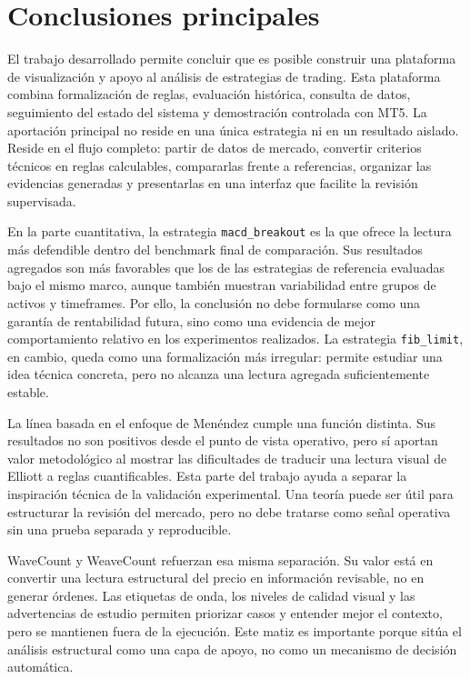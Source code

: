\section{Conclusiones principales}

El trabajo desarrollado permite concluir que es posible construir una plataforma
de visualizaci\'on y apoyo al an\'alisis de estrategias de trading. Esta plataforma
combina formalizaci\'on de reglas, evaluaci\'on hist\'orica, consulta de datos,
seguimiento del estado del sistema y demostraci\'on controlada con MT5. La
aportaci\'on principal no reside en una \'unica estrategia ni en un resultado
aislado. Reside en el flujo completo: partir de datos de mercado, convertir
criterios t\'ecnicos en reglas calculables, compararlas frente a referencias,
organizar las evidencias generadas y presentarlas en una interfaz que facilite
la revisi\'on supervisada.

En la parte cuantitativa, la estrategia \texttt{macd\_breakout} es la que ofrece
la lectura m\'as defendible dentro del benchmark final de comparaci\'on. Sus
resultados agregados son m\'as favorables que los de las estrategias de
referencia evaluadas bajo el mismo marco, aunque tambi\'en muestran variabilidad
entre grupos de activos y timeframes. Por ello, la conclusi\'on no debe
formularse como una garant\'ia de rentabilidad futura, sino como una evidencia de
mejor comportamiento relativo en los experimentos realizados. La estrategia
\texttt{fib\_limit}, en cambio, queda como una formalizaci\'on m\'as irregular:
permite estudiar una idea t\'ecnica concreta, pero no alcanza una lectura
agregada suficientemente estable.

La l\'inea basada en el enfoque de Men\'endez cumple una funci\'on distinta. Sus
resultados no son positivos desde el punto de vista operativo, pero s\'i aportan
valor metodol\'ogico al mostrar las dificultades de traducir una lectura visual
de Elliott a reglas cuantificables. Esta parte del trabajo ayuda a separar la
inspiraci\'on t\'ecnica de la validaci\'on experimental. Una teor\'ia puede ser
\'util para estructurar la revisi\'on del mercado, pero no debe tratarse como
se\~nal operativa sin una prueba separada y reproducible.

WaveCount y WeaveCount refuerzan esa misma separaci\'on. Su valor est\'a en
convertir una lectura estructural del precio en informaci\'on revisable, no en
generar \'ordenes. Las etiquetas de onda, los niveles de calidad visual y las
advertencias de estudio permiten priorizar casos y entender mejor el contexto,
pero se mantienen fuera de la ejecuci\'on. Este matiz es importante porque
sit\'ua el an\'alisis estructural como una capa de apoyo, no como un mecanismo de
decisi\'on autom\'atica.

